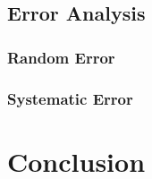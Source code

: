 \documentclass[12pt]{report}
\begin{document}
	\begin{table}[h]
		\centering
		\begin{tabular}{|c|c|}
			\hline
			 
		\end{tabular}
	\end{table}


	\begin{table}[h]
		\centering
		\begin{tabular}{|c|c|c|c|}
			\hline
			 
		\end{tabular}
	\end{table}


	\begin{table}[h]
		\centering
		\begin{tabular}{|c|c|c|}
			\hline
			 
		\end{tabular}
	\end{table}
	
	\begin{table}[h]
		\centering
		\begin{tabular}{|c|c|c|c|}
			\hline
			 
		\end{tabular}
	\end{table}


\section{Error Analysis} %
\label{sec:Error Analysis}

\subsection{Random Error}
\label{subsec:RandomError}


\subsection{Systematic Error}
\label{subsec: Systematic Error}



\chapter{Conclusion}
\label{ch:Conclusion}



\end{document}
